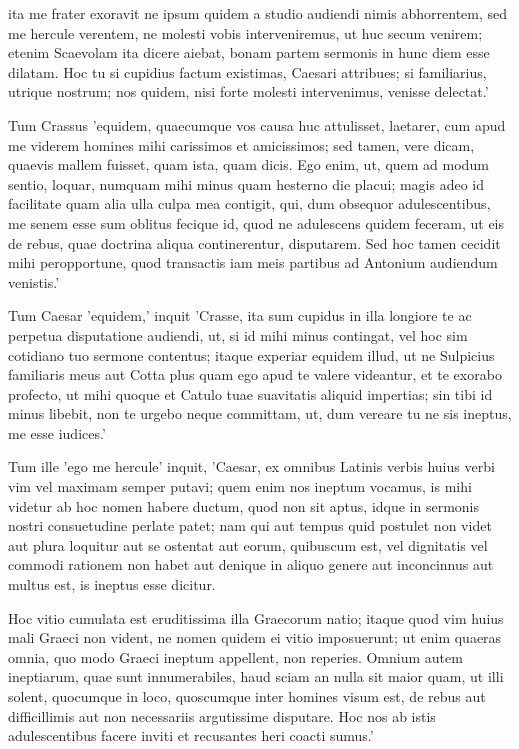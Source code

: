  ita me frater exoravit ne ipsum quidem a studio audiendi nimis abhorrentem, sed me hercule verentem, ne molesti vobis interveniremus, ut huc secum venirem; etenim Scaevolam ita dicere aiebat, bonam partem sermonis in hunc diem esse dilatam. Hoc tu si cupidius factum existimas, Caesari attribues; si familiarius, utrique nostrum; nos quidem, nisi forte molesti intervenimus, venisse delectat.'

 Tum Crassus 'equidem, quaecumque vos causa huc attulisset, laetarer, cum apud me viderem homines mihi carissimos et amicissimos; sed tamen, vere dicam, quaevis mallem fuisset, quam ista, quam dicis. Ego enim, ut, quem ad modum sentio, loquar, numquam mihi minus quam hesterno die placui; magis adeo id facilitate quam alia ulla culpa mea contigit, qui, dum obsequor adulescentibus, me senem esse sum oblitus fecique id, quod ne adulescens quidem feceram, ut eis de rebus, quae doctrina aliqua continerentur, disputarem. Sed hoc tamen cecidit mihi peropportune, quod transactis iam meis partibus ad Antonium audiendum venistis.'

 Tum Caesar 'equidem,' inquit 'Crasse, ita sum cupidus in illa longiore te ac perpetua disputatione audiendi, ut, si id mihi minus contingat, vel hoc sim cotidiano tuo sermone contentus; itaque experiar equidem illud, ut ne Sulpicius familiaris meus aut Cotta plus quam ego apud te valere videantur, et te exorabo profecto, ut mihi quoque et Catulo tuae suavitatis aliquid impertias; sin tibi id minus libebit, non te urgebo neque committam, ut, dum vereare tu ne sis ineptus, me esse iudices.'

 Tum ille 'ego me hercule' inquit, 'Caesar, ex omnibus Latinis verbis huius verbi vim vel maximam semper putavi; quem enim nos ineptum vocamus, is mihi videtur ab hoc nomen habere ductum, quod non sit aptus, idque in sermonis nostri consuetudine perlate patet; nam qui aut tempus quid postulet non videt aut plura loquitur aut se ostentat aut eorum, quibuscum est, vel dignitatis vel commodi rationem non habet aut denique in aliquo genere aut inconcinnus aut multus est, is ineptus esse dicitur.

 Hoc vitio cumulata est eruditissima illa Graecorum natio; itaque quod vim huius mali Graeci non vident, ne nomen quidem ei vitio imposuerunt; ut enim quaeras omnia, quo modo Graeci ineptum appellent, non reperies. Omnium autem ineptiarum, quae sunt innumerabiles, haud sciam an nulla sit maior quam, ut illi solent, quocumque in loco, quoscumque inter homines visum est, de rebus aut difficillimis aut non necessariis argutissime disputare. Hoc nos ab istis adulescentibus facere inviti et recusantes heri coacti sumus.'

